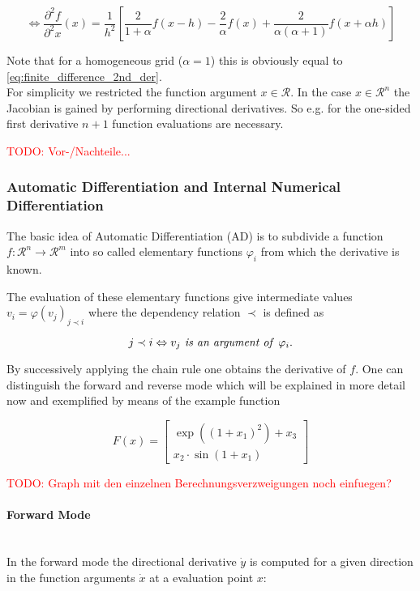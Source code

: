 \documentclass{scrartcl}[12pt, halfparskip]
\newcommand{\todo}[1]{\textcolor{red}{TODO: #1}}
\begin{document}
\begin{equation}
	\Leftrightarrow \frac{\partial^2 f}{\partial^2 x}(x) = \frac{1}{h^2} \left[ \frac{2}{1+\alpha} f(x-h) - \frac{2}{\alpha} f(x) + \frac{2}{\alpha (\alpha+1)} f(x+\alpha h) \right]
\end{equation}

Note that for a homogeneous grid ($\alpha=1$) this is obviously equal to \eqref{eq:finite_difference_2nd_der}. \\

For simplicity we restricted the function argument $x \in \mathcal{R}$. In the case $x \in \mathcal{R}^n$ the Jacobian is gained by performing directional derivatives. So e.g. for the one-sided first derivative $n+1$ function evaluations are necessary.

\todo{Vor-/Nachteile...} 



\subsubsection{Automatic Differentiation and Internal Numerical Differentiation}
The basic idea of Automatic Differentiation (AD) is to subdivide a function $f: \mathcal{R}^n \rightarrow \mathcal{R}^m$ into so called elementary functions $\varphi_i$ from which the derivative is known. 

The evaluation of these elementary functions give intermediate values $v_i = \varphi(v_j)_{j \prec i}$ where the dependency relation $\prec$ is defined as

\begin{equation}
	j \prec i \Leftrightarrow v_j \text{\textit{ is an argument of }} \varphi_i.
\end{equation}

By successively applying the chain rule one obtains the derivative of $f$.
One can distinguish the forward and reverse mode which will be explained in more detail now and exemplified by means of the example function

\begin{equation}
	F(x) = 
	\begin{bmatrix}
	\exp((1+x_1)^2) + x_3 \\
	x_2 \cdot \sin(1+x_1)
	\end{bmatrix}
\end{equation}

\todo{Graph mit den einzelnen Berechnungsverzweigungen noch einfuegen?}

\paragraph{Forward Mode}\mbox{}\\
In the forward mode the directional derivative $\dot{y}$ is computed for a given direction in the function arguments $\dot{x}$ at a evaluation point $x$:
\end{document}
